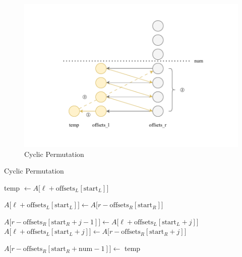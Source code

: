\documentclass{article}
\begin{document}
\begin{center}
\begin{figure}[H]
    \hypertarget{fig:cyclicpermu}{}
    \caption{Cyclic Permutation}
    \centering
    \includegraphics[width=1\textwidth]{cyclicpermu.drawio.pdf}
\end{figure}
\end{center}

\begin{algorithm}[H]
\small
\caption{Cyclic Permutation}\label{CyclicPermutation}
\begin{algorithmic}
    \State temp $\gets A\bigl[\ell +
    \mathrm{offsets}_L[\mathrm{start}_L]\bigr]$  
    
    \State $A\bigl[\ell +
    \mathrm{offsets}_L[\mathrm{start}_L]\bigr] \gets
    A\bigl[r- \mathrm{offsets}_R[\mathrm{start}_R]\bigr]$
    

    \State $A\bigl[r - \mathrm{offsets}_R[\mathrm{start}_R + j - 1]\bigr] \gets
    A\bigl[\ell + \mathrm{offsets}_L[\mathrm{start}_L + j]\bigr]$     
    \State $A\bigl[\ell + \mathrm{offsets}_L[\mathrm{start}_L + j]\bigr]
    \gets A\bigl[r - \mathrm{offsets}_R[\mathrm{start}_R + j ]\bigr]$ 

    \EndFor
    \State $A\bigl[r - \mathrm{offsets}_R[\mathrm{start}_R + \mathrm{num} - 1]\bigr] \gets$
    temp 
\end{algorithmic}
\end{algorithm}
\end{document}
